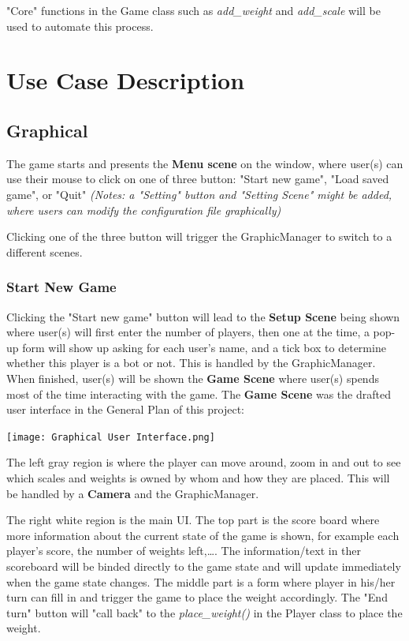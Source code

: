 \documentclass[12pt]{article}
\begin{document}
"Core" functions in the Game class such as \textit{add\_weight} and
\textit{add\_scale} will be used to automate this process.

\section{Use Case Description}

\subsection{Graphical}

The game starts and presents the \textbf{Menu scene} on the window, where
user(s) can use their mouse to click on one of three button: "Start new game",
"Load saved game", or "Quit" \textit{(Notes: a "Setting" button and "Setting
  Scene" might be added, where users can modify the configuration
file graphically)}

Clicking one of the three button will trigger the GraphicManager to switch to a
different scenes.
\subsubsection{Start New Game}

Clicking the "Start new game" button will lead to the \textbf{Setup Scene} being
shown where user(s) will first enter the number of players, then one at the
time, a pop-up form will show up asking for each user's name, and a tick box to
determine whether this player is a bot or not. This is handled by the
GraphicManager. When finished, user(s) will be shown the \textbf{Game Scene}
where user(s) spends most of the time interacting with the game. The
\textbf{Game Scene} was the drafted user interface in the General Plan of this
project:

\texttt{[image: Graphical User Interface.png]}

The left gray region is where the player can move around, zoom in and out to
see which scales and weights is owned by whom and how they are placed. This
will be handled by a \textbf{Camera} and the GraphicManager.

The right white region is the main UI. The top part is the score board where
more information about the current state of the game is shown, for example each
player's score, the number of weights left,\dots. The information/text in ther
scoreboard will be binded directly to the game state and will update immediately
when the game state changes. The middle part is a form where player in his/her
turn can fill in and trigger the game to place the weight accordingly. The "End
turn" button will "call back" to the \textit{place\_weight()} in the Player
class to place the weight.
\end{document}

